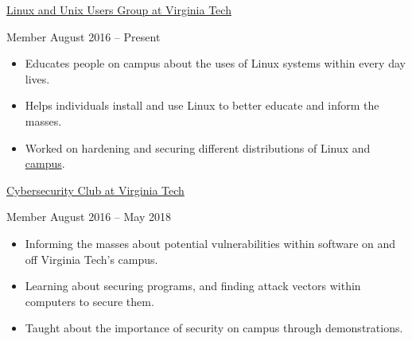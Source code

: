 \documentclass[10pt,a4paper]{article}
\begin{document}



\headedsection
  {\href{https://vtluug.org/}{Linux and Unix Users Group at Virginia Tech}}
   {

  \headedsubsection
    {Member}
    {August 2016 -- Present}
    {\begin{itemize}
        \item Educates people on campus about the uses of Linux systems within every day lives.
        \item Helps individuals install and use Linux to better educate and inform the masses.
        \item Worked on hardening and securing different distributions of Linux and \href{https://www.hokieprivacy.org/}{campus}.
    \end{itemize}}
}


\headedsection
  {\href{http://vtcsec.org/}{Cybersecurity Club at Virginia Tech}}
  {\small\textsc{}} {

  \headedsubsection
    {Member}
    {August 2016 -- May 2018}
    {\begin{itemize}
        \item Informing the masses about potential vulnerabilities within software on and off Virginia Tech's campus.
        \item Learning about securing programs, and finding attack vectors within computers to secure them.
        \item Taught about the importance of security on campus through demonstrations.
    \end{itemize}}
}


\smallskip
\spacedhrule{-0.2em}{-0.4em}
\end{document}
